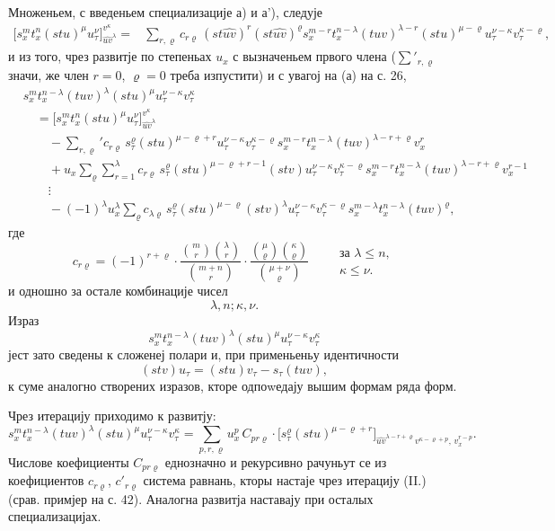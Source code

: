 ﻿\documentclass[11pt]{article}
\begin{document}
Множеньем, с введеньем специализације а) и а'), следује
\[
\begin{aligned}
\bigl[s_x^m t_x^n(stu)^\mu u_\tau^\nu\bigr]_{\widehat{uv}^{\lambda}}^{v^\kappa}
={}&
\sum_{r,\varrho}c_{r\varrho}\,
(st\widehat{uv})^r(st\widehat{uv})^\varrho
s_x^{m-r}t_x^{n-\lambda}(tuv)^{\lambda-r}(stu)^{\mu-\varrho}
u_\tau^{\nu-\kappa}v_\tau^{\kappa-\varrho},
\end{aligned}
\]
и из того, чрез развитје по степеньах $u_x$ с вызначеньем првого члена ($\sum'_{r,\varrho}$ значи, же член $r=0$, $\varrho=0$ треба изпустити) и с увагој на (а) на с. 26,
\[
\tag{II}
\begin{aligned}
&s_x^m t_x^{n-\lambda}(tuv)^\lambda(stu)^\mu u_\tau^{\nu-\kappa}v_\tau^\kappa\\
&\quad =
\bigl[s_x^m t_x^n(stu)^\mu u_\tau^\nu\bigr]_{\widehat{uv}^{\lambda}}^{v^\kappa}\\
&\qquad
-\sum_{r,\varrho}' c_{r\varrho}\,s_\tau^\varrho(stu)^{\mu-\varrho+r}
u_\tau^{\nu-\kappa}v_\tau^{\kappa-\varrho}
s_x^{m-r}t_x^{n-\lambda}(tuv)^{\lambda-r+\varrho}v_x^r\\
&\qquad
+u_x\sum_{\varrho}\sum_{r=1}^{\lambda} c_{r\varrho}\,
s_\tau^\varrho(stu)^{\mu-\varrho+r-1}(stv)
u_\tau^{\nu-\kappa}v_\tau^{\kappa-\varrho}
s_x^{m-r}t_x^{n-\lambda}(tuv)^{\lambda-r+\varrho}v_x^{r-1}\\
&\qquad
\vdots\\
&\qquad
-(-1)^\lambda u_x^\lambda\sum_\varrho c_{\lambda\varrho}\,
s_\tau^\varrho(stu)^{\mu-\varrho}(stv)^\lambda
u_\tau^{\nu-\kappa}v_\tau^{\kappa-\varrho}
s_x^{m-\lambda}t_x^{n-\lambda}(tuv)^\varrho,
\end{aligned}
\]
где
\[
c_{r\varrho}=(-1)^{r+\varrho}\cdot
\frac{\binom{m}{r}\binom{\lambda}{r}}{\binom{m+n}{r}}\cdot
\frac{\binom{\mu}{\varrho}\binom{\kappa}{\varrho}}{\binom{\mu+\nu}{\varrho}}
\qquad
\begin{array}{l}
\text{за }\lambda\le n,\\
\kappa\le\nu.
\end{array}
\]
и одношно за остале комбинације чисел
\[\lambda,n;\kappa,\nu.\]
Израз
\[s_x^m t_x^{n-\lambda}(tuv)^\lambda(stu)^\mu u_\tau^{\nu-\kappa}v_\tau^\kappa\]
јест зато сведены к сложенеј полари и, при применьеньу идентичности
\[
(stv)u_\tau=(stu)v_\tau-s_\tau(tuv),
\]
к суме аналогно створених изразов, кторе одпоwедају вышим формам ряда форм.

Чрез итерацију приходимо к развитју:
\[
\tag{III}
s_x^m t_x^{n-\lambda}(tuv)^\lambda(stu)^\mu u_\tau^{\nu-\kappa}v_\tau^\kappa
=
\sum_{p,r,\varrho}u_x^p\,C_{pr\varrho}\cdot
\bigl[s_\tau^\varrho(stu)^{\mu-\varrho+r}\bigr]_{\widehat{uv}^{\lambda-r+\varrho}v^{\kappa-\varrho+p},\,v_x^{r-p}}.
\]
Числове коефициенты $C_{pr\varrho}$ еднозначно и рекурсивно рачуньут се из коефициентов $c_{r\varrho}$, $c'_{r\varrho}$ система равнань, кторы настаје чрез итерацију (II.) (срав. примјер на с. 42). Аналогна развитја наставају при осталых специализацијах.
\end{document}
